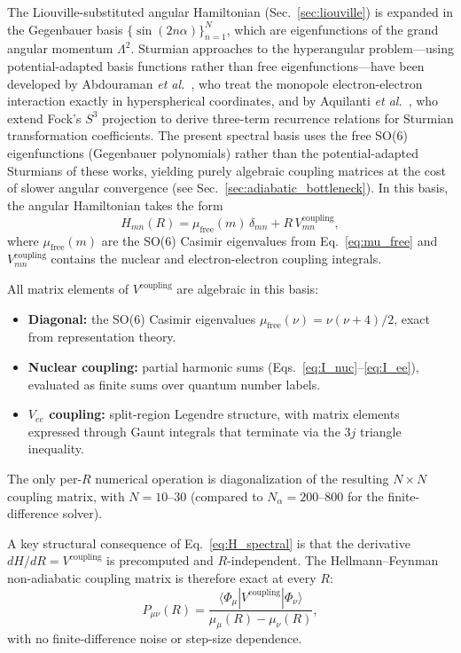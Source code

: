 \documentclass[aps,pra,twocolumn,superscriptaddress,longbibliography]{revtex4-2}
\begin{document}
The Liouville-substituted angular Hamiltonian (Sec.~\ref{sec:liouville})
is expanded in the Gegenbauer basis $\{\sin(2n\alpha)\}_{n=1}^{N}$,
which are eigenfunctions of the grand angular momentum $\Lambda^2$.
Sturmian approaches to the hyperangular problem---using
potential-adapted basis functions rather than free eigenfunctions---have
been developed by Abdouraman \textit{et al.}~\cite{Abdouraman2016},
who treat the monopole electron-electron interaction exactly in
hyperspherical coordinates, and by Aquilanti \textit{et al.}~\cite{Aquilanti2001},
who extend Fock's $S^3$ projection to derive three-term recurrence
relations for Sturmian transformation coefficients.  The present
spectral basis uses the free SO(6) eigenfunctions (Gegenbauer
polynomials) rather than the potential-adapted Sturmians of these
works, yielding purely algebraic coupling matrices at the cost of
slower angular convergence (see Sec.~\ref{sec:adiabatic_bottleneck}).
In this basis, the angular Hamiltonian takes the form
\begin{equation}
  H_{mn}(R) = \mu_{\mathrm{free}}(m)\,\delta_{mn}
  + R\,V^{\mathrm{coupling}}_{mn},
  \label{eq:H_spectral}
\end{equation}
where $\mu_{\mathrm{free}}(m)$ are the SO(6) Casimir eigenvalues
from Eq.~\eqref{eq:mu_free} and $V^{\mathrm{coupling}}_{mn}$ contains
the nuclear and electron-electron coupling integrals.

All matrix elements of $V^{\mathrm{coupling}}$ are algebraic in this
basis:
\begin{itemize}
  \item \textbf{Diagonal:} the SO(6) Casimir eigenvalues
    $\mu_{\mathrm{free}}(\nu) = \nu(\nu+4)/2$, exact from
    representation theory.
  \item \textbf{Nuclear coupling:} partial harmonic sums
    (Eqs.~\ref{eq:I_nuc}--\ref{eq:I_ee}), evaluated as finite sums
    over quantum number labels.
  \item \textbf{$V_{ee}$ coupling:} split-region Legendre structure,
    with matrix elements expressed through Gaunt integrals that
    terminate via the $3j$ triangle inequality.
\end{itemize}
The only per-$R$ numerical operation is diagonalization of the
resulting $N \times N$ coupling matrix, with $N = 10$--$30$
(compared to $N_\alpha = 200$--$800$ for the finite-difference solver).

A key structural consequence of Eq.~\eqref{eq:H_spectral} is that
the derivative $dH/dR = V^{\mathrm{coupling}}$ is precomputed and
$R$-independent.  The Hellmann--Feynman non-adiabatic coupling
matrix is therefore exact at every $R$:
\begin{equation}
  P_{\mu\nu}(R) = \frac{\langle\Phi_\mu|V^{\mathrm{coupling}}|\Phi_\nu\rangle}
  {\mu_\mu(R) - \mu_\nu(R)},
  \label{eq:P_hellmann_feynman}
\end{equation}
with no finite-difference noise or step-size dependence.
\end{document}

